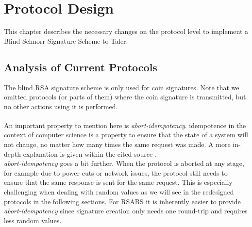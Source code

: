 \chapter{Protocol Design}
\label{chap:design}
This chapter describes the necessary changes on the protocol level to implement a Blind Schnorr Signature Scheme to Taler.


\section{Analysis of Current Protocols}
The blind RSA signature scheme is only used for coin signatures.
Note that we omitted protocols (or parts of them) where the coin signature is transmitted, but no other actions using it is performed.
\\\\
\label{abort-idempotency}
An important property to mention here is \textit{\gls{abort-idempotency}}.
\Gls{idempotence} in the context of computer science is a property to ensure that the state of a system will not change, no matter how many times the same request was made.
A more in-depth explanation is given within the cited source \cite{yuchen:idempotence}.\\
\textit{\gls{abort-idempotency}} goes a bit further.
When the protocol is aborted at any stage, for example due to power cuts or network issues, the protocol still needs to ensure that the same response is sent for the same request.
This is especially challenging when dealing with random values as we will see in the redesigned protocols in the following sections.
For \gls{RSABS} it is inherently easier to provide \textit{\gls{abort-idempotency}} since signature creation only needs one round-trip and requires less random values.

